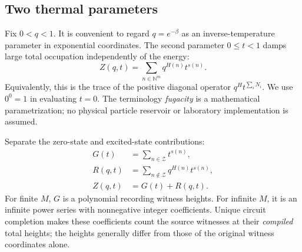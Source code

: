 \documentclass[11pt,letterpaper]{article}
\theoremstyle{definition}
\theoremstyle{remark}
\newcommand{\N}{\mathbb N}
\begin{document}
\subsection{Two thermal parameters}
Fix $0<q<1$. It is convenient to regard $q=e^{-\beta}$ as an inverse-temperature parameter in exponential coordinates. The second parameter $0\le t<1$ damps large total occupation independently of the energy:
\begin{equation}\label{ste:ta:eq:Z}
Z(q,t)=\sum_{n\in\N^m}q^{H(n)}t^{s(n)}.
\end{equation}
Equivalently, this is the trace of the positive diagonal operator $q^H t^{\sum_i N_i}$. We use $0^0=1$ in evaluating $t=0$. The terminology \emph{fugacity} is a mathematical parametrization; no physical particle reservoir or laboratory implementation is assumed.

Separate the zero-state and excited-state contributions:
\begin{align}
G(t)&=\sum_{n\in\mathcal Z}t^{s(n)},\label{ste:ta:eq:G}\\
R(q,t)&=\sum_{n\notin\mathcal Z}q^{H(n)}t^{s(n)},\label{ste:ta:eq:R}\\
Z(q,t)&=G(t)+R(q,t).\label{ste:ta:eq:ZR}
\end{align}
For finite $M$, $G$ is a polynomial recording witness heights. For infinite $M$, it is an infinite power series with nonnegative integer coefficients. Unique circuit completion makes these coefficients count the source witnesses at their \emph{compiled} total heights; the heights generally differ from those of the original witness coordinates alone.
\end{document}
